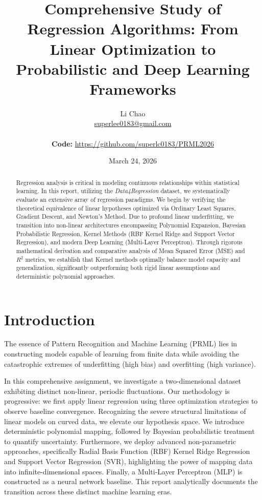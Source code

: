 \documentclass[12pt,a4paper]{article}
\title{\textbf{\Large Comprehensive Study of Regression Algorithms: From Linear Optimization to Probabilistic and Deep Learning Frameworks}}
\author{
    Li Chao \\ 
    \href{mailto:superlee0183@gmail.com}{superlee0183@gmail.com} \\
    \vspace{0.1cm} \\
    \normalsize \textbf{Code:} \url{https://github.com/superlc0183/PRML2026}
}
\date{March 24, 2026}
\begin{document}
\maketitle 

\begin{abstract}
Regression analysis is critical in modeling continuous relationships within statistical learning. In this report, utilizing the \textit{Data4Regression} dataset, we systematically evaluate an extensive array of regression paradigms. We begin by verifying the theoretical equivalence of linear hypotheses optimized via Ordinary Least Squares, Gradient Descent, and Newton's Method. Due to profound linear underfitting, we transition into non-linear architectures encompassing Polynomial Expansion, Bayesian Probabilistic Regression, Kernel Methods (RBF Kernel Ridge and Support Vector Regression), and modern Deep Learning (Multi-Layer Perceptron). Through rigorous mathematical derivation and comparative analysis of Mean Squared Error (MSE) and $R^2$ metrics, we establish that Kernel methods optimally balance model capacity and generalization, significantly outperforming both rigid linear assumptions and deterministic polynomial approaches.
\end{abstract}

\newpage
\renewcommand{\contentsname}{\large\bfseries\filcenter Contents} %
\tableofcontents
\newpage

\section{Introduction}
The essence of Pattern Recognition and Machine Learning (PRML) lies in constructing models capable of learning from finite data while avoiding the catastrophic extremes of underfitting (high bias) and overfitting (high variance). 

In this comprehensive assignment, we investigate a two-dimensional dataset exhibiting distinct non-linear, periodic fluctuations. Our methodology is progressive: we first apply linear regression using three optimization strategies to observe baseline convergence. Recognizing the severe structural limitations of linear models on curved data, we elevate our hypothesis space. We introduce deterministic polynomial mapping, followed by Bayesian probabilistic treatment to quantify uncertainty. Furthermore, we deploy advanced non-parametric approaches, specifically Radial Basis Function (RBF) Kernel Ridge Regression and Support Vector Regression (SVR), highlighting the power of mapping data into infinite-dimensional spaces. Finally, a Multi-Layer Perceptron (MLP) is constructed as a neural network baseline. This report analytically documents the transition across these distinct machine learning eras.
\end{document}
